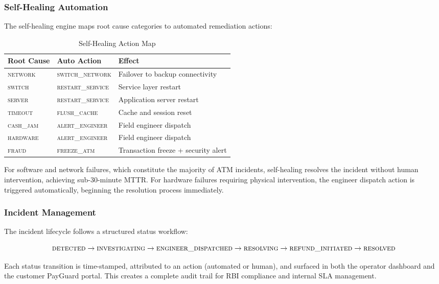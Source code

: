 \documentclass[12pt,a4paper]{article}
\begin{document}
\subsubsection{Self-Healing Automation}

The self-healing engine maps root cause categories to automated remediation actions:

\begin{table}[H]
\centering
\caption{Self-Healing Action Map}
\small
\begin{tabular}{@{}L{4cm} L{4cm} L{5cm}@{}}
\toprule
\textbf{Root Cause} & \textbf{Auto Action} & \textbf{Effect} \\
\midrule
\textsc{network}   & \textsc{switch\_network}   & Failover to backup connectivity \\
\textsc{switch}    & \textsc{restart\_service}  & Service layer restart \\
\textsc{server}    & \textsc{restart\_service}  & Application server restart \\
\textsc{timeout}   & \textsc{flush\_cache}      & Cache and session reset \\
\textsc{cash\_jam} & \textsc{alert\_engineer}   & Field engineer dispatch \\
\textsc{hardware}  & \textsc{alert\_engineer}   & Field engineer dispatch \\
\textsc{fraud}     & \textsc{freeze\_atm}       & Transaction freeze + security alert \\
\bottomrule
\end{tabular}
\end{table}

For software and network failures, which constitute the majority of ATM incidents, self-healing
resolves the incident without human intervention, achieving sub-30-minute MTTR. For hardware
failures requiring physical intervention, the engineer dispatch action is triggered automatically,
beginning the resolution process immediately.

\subsubsection{Incident Management}

The incident lifecycle follows a structured status workflow:

\[
\textsc{detected} \to \textsc{investigating} \to \textsc{engineer\_dispatched} \to
\textsc{resolving} \to \textsc{refund\_initiated} \to \textsc{resolved}
\]

Each status transition is time-stamped, attributed to an action (automated or human), and
surfaced in both the operator dashboard and the customer PayGuard portal. This creates a
complete audit trail for RBI compliance and internal SLA management.
\end{document}
